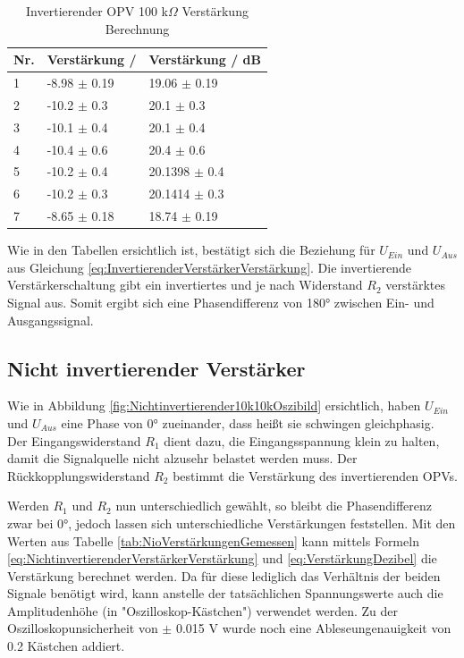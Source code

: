 \documentclass[12pt,a4paper,twoside]{article}
\begin{document}
\begin{table}[H]
    \centering
    \caption{Invertierender OPV 100 k$\Omega$ Verstärkung Berechnung}
    \label{tab:IoVerstärkungenBerechnet100}
    \begin{tabular}{| l | l | l |}
        \hline
        Nr. & Verstärkung / & Verstärkung / dB \\
        \hline
        1 & -8.98 $\pm$ 0.19 & 19.06 $\pm$ 0.19 \\
        2 & -10.2 $\pm$ 0.3 & 20.1 $\pm$ 0.3 \\
        3 & -10.1 $\pm$ 0.4 & 20.1 $\pm$ 0.4 \\
        4 & -10.4 $\pm$ 0.6 & 20.4 $\pm$ 0.6 \\
        5 & -10.2 $\pm$ 0.4 & 20.1398 $\pm$ 0.4 \\
        6 & -10.2 $\pm$ 0.3 & 20.1414 $\pm$ 0.3 \\
        7 & -8.65 $\pm$ 0.18 & 18.74 $\pm$ 0.19 \\
        \hline
    \end{tabular}
\end{table}

\noindent
Wie in den Tabellen ersichtlich ist, bestätigt sich die Beziehung für $U_{Ein}$ und $U_{Aus}$ aus Gleichung \ref{eq:InvertierenderVerstärkerVerstärkung}.
Die invertierende Verstärkerschaltung gibt ein invertiertes und je nach Widerstand $R_{2}$ verstärktes Signal aus. Somit ergibt sich eine Phasendifferenz von 180° zwischen Ein- und Ausgangssignal.


\subsection{Nicht invertierender Verstärker}

Wie in Abbildung \ref{fig:Nichtinvertierender10k10kOszibild} ersichtlich, haben $U_{Ein}$ und $U_{Aus}$ eine Phase von 0° zueinander, dass heißt sie schwingen gleichphasig.
Der Eingangswiderstand $R_{1}$ dient dazu, die Eingangsspannung klein zu halten, damit die Signalquelle nicht alzusehr belastet werden muss. Der Rückkopplungswiderstand $R_{2}$ bestimmt die Verstärkung des invertierenden OPVs. \newline

\noindent
Werden $R_{1}$ und $R_{2}$ nun unterschiedlich gewählt, so bleibt die Phasendifferenz zwar bei 0°, jedoch lassen sich unterschiedliche Verstärkungen feststellen. 
Mit den Werten aus Tabelle \ref{tab:NioVerstärkungenGemessen} kann mittels Formeln \ref{eq:NichtinvertierenderVerstärkerVerstärkung} und \ref{eq:VerstärkungDezibel} die Verstärkung berechnet werden. Da für diese lediglich das Verhältnis der beiden Signale benötigt wird, kann anstelle der tatsächlichen Spannungswerte auch die Amplitudenhöhe (in "Oszilloskop-Kästchen") verwendet werden.
Zu der Oszilloskopunsicherheit von $\pm$ 0.015 V wurde noch eine Ableseungenauigkeit von 0.2 Kästchen addiert.
\end{document}
